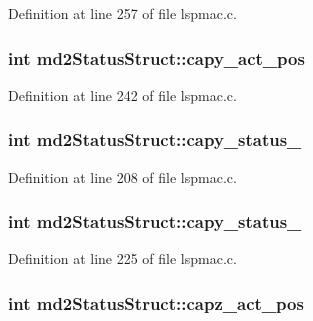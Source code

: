Definition at line 257 of file lspmac.c.\hypertarget{structmd2StatusStruct_ae25122a6db146501b51609b9cb59b044}{
\subsubsection[{capy\_\-act\_\-pos}]{\setlength{\rightskip}{0pt plus 5cm}int {\bf md2StatusStruct::capy\_\-act\_\-pos}}}
\label{structmd2StatusStruct_ae25122a6db146501b51609b9cb59b044}


Definition at line 242 of file lspmac.c.\hypertarget{structmd2StatusStruct_a7f4e945e80b1980b9e69366a69ad79cc}{
\subsubsection[{capy\_\-status\_\-1}]{\setlength{\rightskip}{0pt plus 5cm}int {\bf md2StatusStruct::capy\_\-status\_}}}
\label{structmd2StatusStruct_a7f4e945e80b1980b9e69366a69ad79cc}


Definition at line 208 of file lspmac.c.\hypertarget{structmd2StatusStruct_a5d7c10d9a16ebcc53ac4a0770ab2ef62}{
\subsubsection[{capy\_\-status\_\-2}]{\setlength{\rightskip}{0pt plus 5cm}int {\bf md2StatusStruct::capy\_\-status\_}}}
\label{structmd2StatusStruct_a5d7c10d9a16ebcc53ac4a0770ab2ef62}


Definition at line 225 of file lspmac.c.\hypertarget{structmd2StatusStruct_a257c04efac3a33d5d34b21d64c6f1266}{
\subsubsection[{capz\_\-act\_\-pos}]{\setlength{\rightskip}{0pt plus 5cm}int {\bf md2StatusStruct::capz\_\-act\_\-pos}}}
\label{structmd2StatusStruct_a257c04efac3a33d5d34b21d64c6f1266}


